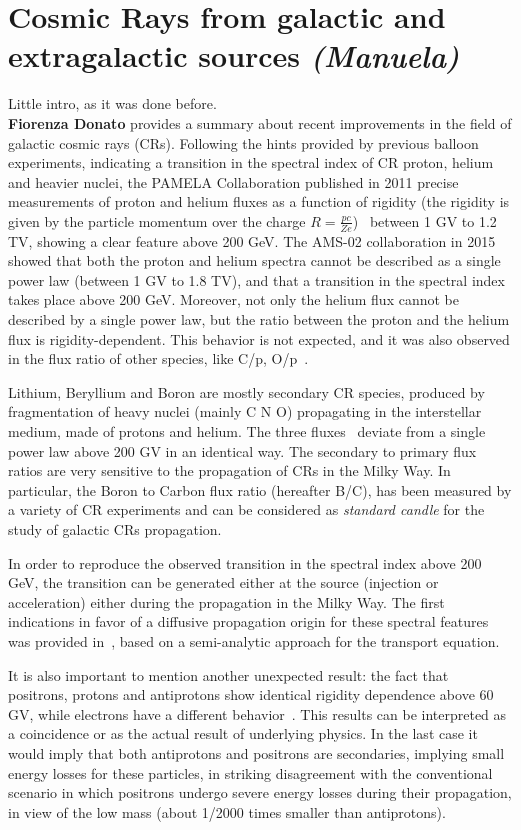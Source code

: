 \documentclass{PoS}
\begin{document}
\section{Cosmic Rays from galactic and extragalactic sources {\it (Manuela)}}
Little intro, as it was done before.\\
{\bf Fiorenza Donato} provides a summary about recent improvements in the field of galactic cosmic rays (CRs). Following the hints provided by previous balloon experiments, indicating a transition in the spectral index of CR 
proton, helium and heavier nuclei, the 
PAMELA Collaboration published in 2011
precise measurements of proton and helium fluxes as a function of rigidity (the rigidity is given by the particle momentum over the charge $R=\frac{pc}{Ze}$)~\cite{PAMELApHe} between 1 GV to 1.2 TV, showing a clear feature above 200 GeV. 
The AMS-02 collaboration in 2015~\cite{proton}~\cite{Aguilar:2015ctt} showed  
that both the proton and helium spectra
 cannot be described as a single power law (between 1 GV to 1.8 TV), and that
a transition in the spectral index takes place above 200 GeV.  Moreover, not only the helium flux cannot be described by a single power law, but the ratio
between the proton and the helium flux is rigidity-dependent. This behavior is not expected, and it was also observed in the flux ratio of other species,
like C/p, O/p~\cite{heco}. 

Lithium, Beryllium and Boron are mostly secondary CR species,
produced by fragmentation of heavy nuclei (mainly C N O) propagating in the interstellar medium, made of protons and helium. 
The three fluxes~\cite{libeb} deviate from a single power law above 200 GV in an identical way.
The  secondary to primary flux ratios are very sensitive to the propagation of CRs in the Milky Way. In particular, the Boron to Carbon flux ratio (hereafter B/C), has been measured by a variety of CR experiments and
can be considered as \textit{standard candle} for the study of galactic CRs propagation. 

In order to reproduce the observed transition in the spectral index above 200 GeV, the transition can be generated  either at the source (injection or acceleration) 
either during the propagation in the Milky Way. The first indications in favor of a diffusive propagation origin for these spectral features was provided in~\cite{Genolini:2017dfb}, based on a semi-analytic approach for the transport equation. 

It is also important to mention another unexpected result: the fact that positrons, protons and antiprotons show identical rigidity dependence above 60 GV, while electrons have a different behavior~\cite{antip}. This results can be interpreted as a  coincidence or as the actual result of underlying physics. In the last case it would imply that both antiprotons and positrons are secondaries, implying small energy losses for these particles, in striking disagreement with the conventional scenario in which positrons undergo severe energy losses during their propagation, in view of the low mass (about 1/2000 times smaller than antiprotons).
\end{document}
